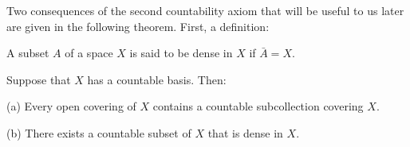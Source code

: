 Two consequences of the second countability axiom that will be useful to us later are given in the following theorem. First, a definition:

\begin{definition}
 A subset \(A\) of a space \(X\) is said to be dense in \(X\) if \(\bar{A} = X\).
\end{definition}

\begin{theorem}
\label{thm:\thetheorem}
 Suppose that \(X\) has a countable basis. Then:

(a) Every open covering of \(X\) contains a countable subcollection covering \(X\).

(b) There exists a countable subset of \(X\) that is dense in \(X\).

\end{theorem}
